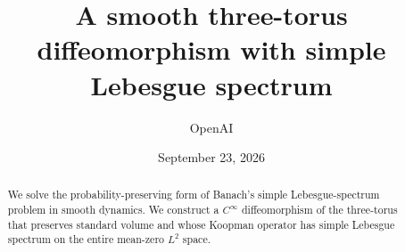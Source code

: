 \documentclass[11pt]{article}
\title{A smooth three-torus diffeomorphism with simple Lebesgue spectrum}
\author{OpenAI}
\date{September 23, 2026}
\newcommand{\1}{\mathbf 1}
\theoremstyle{definition}
\theoremstyle{remark}
\numberwithin{equation}{section}
\begin{document}
\maketitle
\begin{abstract}
We solve the probability-preserving form of Banach's simple Lebesgue-spectrum problem in smooth dynamics. We construct a $C^\infty$ diffeomorphism of the three-torus that preserves standard volume and whose Koopman operator has simple Lebesgue spectrum on the entire mean-zero $L^2$ space.
\end{abstract}
\tableofcontents






\begingroup
\small


\endgroup
\end{document}
